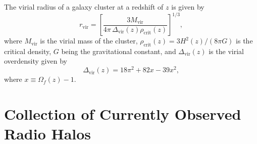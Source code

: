 \documentclass[twocolumn]{aastex62}
\newcommand{\R}[1]{\mathrm{#1}}
\begin{document}
The virial radius of a galaxy cluster at a redshift of $z$ is given by
\begin{equation}
  \label{eq:radius-virial}
  r_{\R{vir}} = \left[
    \frac{3 M_{\R{vir}}}{4\pi \,\Delta_{\R{vir}}(z) \rho_{\R{crit}}(z)}
  \right]^{1/3},
\end{equation}
where $M_{\R{vir}}$ is the virial mass of the cluster,
$\rho_{\R{crit}}(z) = 3 H^2(z) / (8\pi G)$ is the critical density,
$G$ being the gravitational constant, and $\Delta_{\R{vir}}(z)$ is the
virial overdensity given by \citep[e.g.,][]{bryan1998}
\begin{equation}
  \label{eq:delta-vir}
  \Delta_{\R{vir}}(z) = 18\pi^2 + 82x - 39x^2 ,
\end{equation}
where $x \equiv \Omega_f(z) - 1$.


\section{Collection of Currently Observed Radio Halos}
\label{sec:halos-collection}
\end{document}
